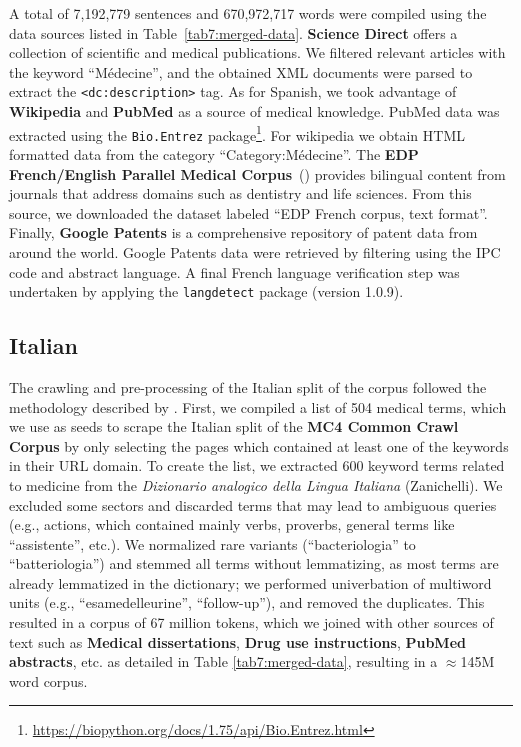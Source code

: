 A total of 7,192,779 sentences and 670,972,717 words were compiled using the data sources listed in Table~\ref{tab7:merged-data}. \textbf{Science Direct} offers a collection of scientific and medical publications. We filtered relevant articles with the keyword ``Médecine'', and the obtained XML documents were parsed to extract the \texttt{<dc:description>} tag.
As for Spanish, we took advantage of \textbf{Wikipedia} and \textbf{PubMed} as a source of medical knowledge. PubMed data was extracted using the \texttt{Bio.Entrez} package\footnote{\url{https://biopython.org/docs/1.75/api/Bio.Entrez.html}}. For wikipedia we obtain HTML formatted data from the category ``Category:Médecine''. The \textbf{EDP French/English Parallel Medical Corpus}~(\cite{DBLP:conf/wmt/Jimeno-YepesNNV17}) provides bilingual content from journals that address domains such as dentistry and life sciences. From this source, we downloaded the dataset labeled ``EDP French corpus, text format''. Finally, \textbf{Google Patents} is a comprehensive repository of patent data from around the world. Google Patents data were retrieved by filtering using the IPC code and abstract language. A final French language verification step was undertaken by applying the \texttt{langdetect} package (version 1.0.9).

\subsection{Italian}

The crawling and pre-processing of the Italian split of the corpus followed the methodology described by \citet{carrino-etal-2022-pretrained}. First, we compiled a list of 504 medical terms, which we use as seeds to scrape the Italian split of the \textbf{MC4 Common Crawl Corpus} by only selecting the pages which contained at least one of the keywords in their URL domain. To create the list, we extracted 600 keyword terms related to medicine from the \textit{Dizionario analogico della Lingua Italiana} (Zanichelli). We excluded some sectors and discarded terms that may lead to ambiguous queries (e.g., actions, which contained mainly verbs, proverbs, general terms like ``assistente'', etc.). We normalized rare variants (``bacteriologia'' to ``batteriologia'') and stemmed all terms without lemmatizing, as most terms are already lemmatized in the dictionary; we performed univerbation of multiword units (e.g., ``esamedelleurine'', ``follow-up''), and removed the duplicates. This resulted in a corpus of 67 million tokens, which we joined with other sources of text such as \textbf{Medical dissertations}, \textbf{Drug use instructions}, \textbf{PubMed abstracts}, etc. as detailed in Table \ref{tab7:merged-data}, resulting in a $\approx$145M word corpus. 

